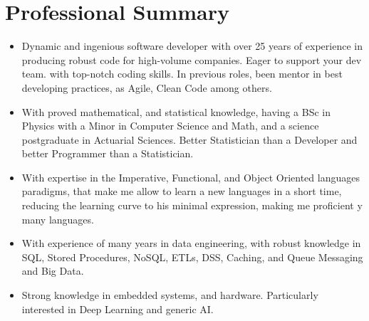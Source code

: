 \section{Professional Summary}

\begin{itemize}
    \item Dynamic and ingenious software developer with over 25 years of experience in producing robust code for
          high-volume companies. Eager to support your dev team. with top-notch coding skills. In previous roles,
          been mentor in best developing practices, as Agile, Clean Code among others.
    \item With proved mathematical, and statistical knowledge, having a BSc in Physics with a Minor in Computer
          Science and Math, and a science postgraduate in Actuarial Sciences. Better Statistician than a Developer
          and better Programmer than a Statistician.
    \item With expertise in the Imperative, Functional, and Object Oriented languages paradigms, that make me
          allow to learn a new languages in a short time, reducing the learning curve to  his minimal expression,
          making me proficient y many languages.
    \item With experience of many years in data engineering, with robust knowledge in  SQL, Stored Procedures,
          NoSQL, ETLs, DSS, Caching, and Queue Messaging and Big Data.
    \item Strong knowledge in embedded systems, and hardware.
          Particularly interested in Deep Learning and generic AI.
\end{itemize}
